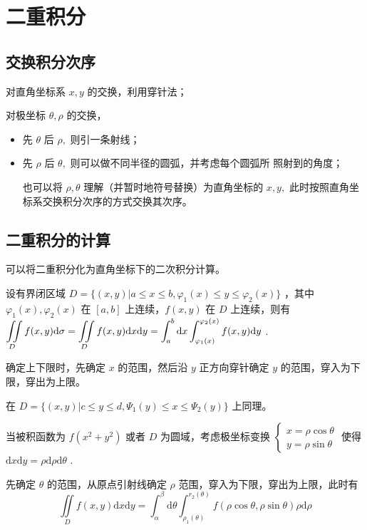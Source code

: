 \chapter{二重积分}

\section{交换积分次序}

对直角坐标系 $ x,y $ 的交换，利用穿针法；

对极坐标 $ \theta,\rho $ 的交换，
\begin{itemize}
    \item 先 $ \theta $ 后 $ \rho, $ 则引一条射线；
    \item 先 $ \rho $ 后 $ \theta, $ 则可以做不同半径的圆弧，并考虑每个圆弧所
    照射到的角度；

    也可以将 $ \rho,\theta $ 理解（并暂时地符号替换）为直角坐标的 $ x,y, $ 
    此时按照直角坐标系交换积分次序的方式交换其次序。
\end{itemize}

\section{二重积分的计算}


可以将二重积分化为直角坐标下的二次积分计算。

设有界闭区域 $ D = \{(x,y)|a\leq x\leq b,\varphi_1(x)\leq y\leq \varphi_2(x)\} $ ，其中
$ \varphi_1(x),\varphi_2(x) $ 在 $ [a,b] $ 上连续，$ f(x,y) $ 在 $ D $ 上连续，则有
$ \displaystyle \iint\limits_{D}f(x,y)\mathrm{d}\sigma = \iint\limits_{D}f(x,y)\mathrm{d}x\mathrm{d}y
 = \int_a^b\mathrm{d}x\int_{\varphi_1(x)}^{\varphi_2(x)}f(x,y)\mathrm{d}y $ .

确定上下限时，先确定 $ x $ 的范围，然后沿 $ y $ 正方向穿针确定 $ y $ 的范围，穿入为下限，穿出为上限。

在 $ D = \{(x,y)|c\leq y\leq d,\varPsi_1(y)\leq x\leq \varPsi_2(y)\} $ 上同理。


当被积函数为 $ f(x^2+y^2) $ 或者 $ D $ 为圆域，考虑极坐标变换 $ \left\{\begin{matrix}
    x = \rho\cos\theta\\ y = \rho\sin\theta
\end{matrix}\right. $ 使得 $ \mathrm{d}x\mathrm{d}y = \rho\mathrm{d}\rho\mathrm{d}\theta $ .

先确定 $ \theta $ 的范围，从原点引射线确定 $ \rho $ 范围，穿入为下限，穿出为上限，此时有$$
    \iint\limits_{D}f(x,y)\mathrm{d}x\mathrm{d}y = \int_\alpha^\beta \mathrm{d}\theta
    \int_{\rho_1(\theta)}^{r_2(\theta)}f(\rho\cos\theta,\rho\sin\theta)\rho\mathrm{d}\rho
$$ 

